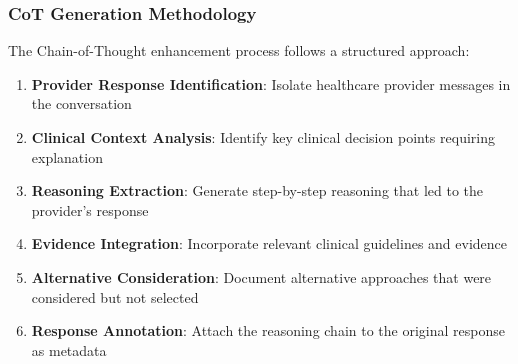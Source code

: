 \subsubsection{CoT Generation Methodology}

The Chain-of-Thought enhancement process follows a structured approach:

\begin{enumerate}
    \item \textbf{Provider Response Identification}: Isolate healthcare provider messages in the conversation
    \item \textbf{Clinical Context Analysis}: Identify key clinical decision points requiring explanation
    \item \textbf{Reasoning Extraction}: Generate step-by-step reasoning that led to the provider's response
    \item \textbf{Evidence Integration}: Incorporate relevant clinical guidelines and evidence
    \item \textbf{Alternative Consideration}: Document alternative approaches that were considered but not selected
    \item \textbf{Response Annotation}: Attach the reasoning chain to the original response as metadata
\end{enumerate}
